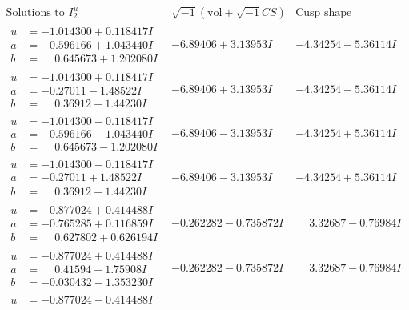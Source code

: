 \documentclass[1p]{elsarticle_modified}
\theoremstyle{definition}
\newcommand{\I}{\sqrt{-1}}
\begin{document}
$$\begin{array}{c|c|c}  
\text{Solutions to }I^u_{2}& \I (\text{vol} + \sqrt{-1}CS) & \text{Cusp shape}\\
 \hline 
\begin{aligned}
u &= -1.014300 + 0.118417 I \\
a &= -0.596166 + 1.043440 I \\
b &= \phantom{-}0.645673 + 1.202080 I\end{aligned}
 & -6.89406 + 3.13953 I & -4.34254 - 5.36114 I \\ \hline\begin{aligned}
u &= -1.014300 + 0.118417 I \\
a &= -0.27011 - 1.48522 I \\
b &= \phantom{-}0.36912 - 1.44230 I\end{aligned}
 & -6.89406 + 3.13953 I & -4.34254 - 5.36114 I \\ \hline\begin{aligned}
u &= -1.014300 - 0.118417 I \\
a &= -0.596166 - 1.043440 I \\
b &= \phantom{-}0.645673 - 1.202080 I\end{aligned}
 & -6.89406 - 3.13953 I & -4.34254 + 5.36114 I \\ \hline\begin{aligned}
u &= -1.014300 - 0.118417 I \\
a &= -0.27011 + 1.48522 I \\
b &= \phantom{-}0.36912 + 1.44230 I\end{aligned}
 & -6.89406 - 3.13953 I & -4.34254 + 5.36114 I \\ \hline\begin{aligned}
u &= -0.877024 + 0.414488 I \\
a &= -0.765285 + 0.116859 I \\
b &= \phantom{-}0.627802 + 0.626194 I\end{aligned}
 & -0.262282 - 0.735872 I & \phantom{-}3.32687 - 0.76984 I \\ \hline\begin{aligned}
u &= -0.877024 + 0.414488 I \\
a &= \phantom{-}0.41594 - 1.75908 I \\
b &= -0.030432 - 1.353230 I\end{aligned}
 & -0.262282 - 0.735872 I & \phantom{-}3.32687 - 0.76984 I \\ \hline\begin{aligned}
u &= -0.877024 - 0.414488 I \\

\end{aligned}
\end{array}$$
\end{document}
